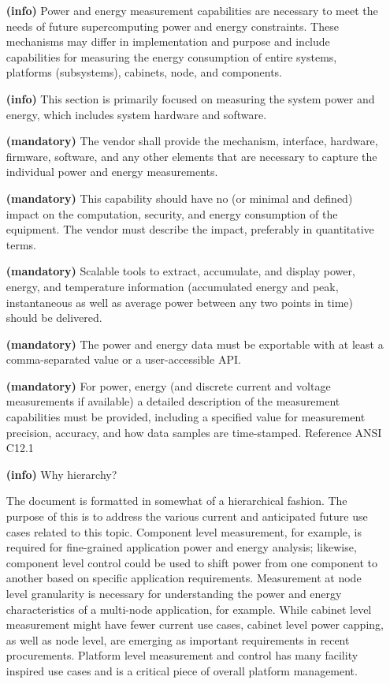 \begin{itemize}
\item[{\textbf{(info)}}]
Power and energy measurement capabilities are necessary to meet the needs of future 
supercomputing power and energy constraints. These mechanisms may differ in implementation 
and purpose and include capabilities for measuring the energy consumption of entire systems, 
platforms (subsystems), cabinets, node, and components.  

\item[{\textbf{(info)}}]
This section is primarily focused on measuring the system power and energy, 
which includes system hardware and software.  

\item[{\textbf{(mandatory)}}]
The vendor shall provide the mechanism, interface, hardware, firmware, software, 
and any other elements that are necessary to capture the individual power and energy measurements. 

\item[{\textbf{(mandatory)}}]
This capability should have no (or minimal and defined) impact on the computation, 
security, and energy consumption of the equipment.  The vendor must describe 
the impact, preferably in quantitative terms.  

\item[{\textbf{(mandatory)}}]
Scalable tools to extract, accumulate, and display power, energy, and temperature 
information (accumulated energy and peak, instantaneous as well as average power 
between any two points in time) should be delivered.

\item[{\textbf{(mandatory)}}]
The power and energy data must be exportable with at least a comma-separated value or 
a user-accessible API. 

\item[{\textbf{(mandatory)}}]
For power, energy (and discrete current and voltage measurements if available) a 
detailed description of the measurement capabilities must be provided, 
including a specified value for measurement precision, accuracy, and how data 
samples are time-stamped. 
Reference ANSI C12.1

\item[{\textbf{(info)}}]
Why hierarchy?

The document is formatted in somewhat of a hierarchical fashion. The purpose of this 
is to address the various current and anticipated future use cases related to this topic. 
Component level measurement, for example, is required for fine-grained application 
power and energy analysis; likewise, component level control could be used to 
shift power from one component to another based on specific application requirements. 
Measurement at node level granularity is necessary for understanding the power and 
energy characteristics of a multi-node application, for example. While cabinet level 
measurement might have fewer current use cases, cabinet level power capping, as well as 
node level, are emerging as important requirements in recent procurements. Platform level 
measurement and control has many facility inspired use cases and is a critical piece of 
overall platform management.


\end{itemize}
